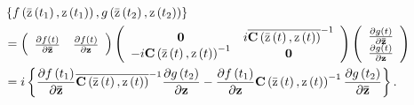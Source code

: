 \documentclass[aps,preprint]{revtex4}%
\begin{document}
\begin{align}
&  \left\{  f\left(  \mathrm{\bar{z}}\left(  t_{1}\right)  \mathrm{,z}\left(
t_{1}\right)  \right)  ,g\left(  \mathrm{\bar{z}}\left(  t_{2}\right)
\mathrm{,z}\left(  t_{2}\right)  \right)  \right\} \nonumber\\
&  =\left(
\begin{array}
[c]{cc}%
\frac{\partial f\left(  t\right)  }{\partial\mathbf{\bar{z}}} & \frac{\partial
f\left(  t\right)  }{\partial\mathbf{z}}%
\end{array}
\right)  \left(
\begin{array}
[c]{cc}%
\mathbf{0} & i\overline{\mathbf{C}\left(  \mathrm{\bar{z}}\left(  t\right)
\mathrm{,z}\left(  t\right)  \right)  }^{-1}\\
-i\mathbf{C}\left(  \mathrm{\bar{z}}\left(  t\right)  \mathrm{,z}\left(
t\right)  \right)  ^{-1} & \mathbf{0}%
\end{array}
\right)  \left(
\begin{array}
[c]{c}%
\frac{\partial g\left(  t\right)  }{\partial\mathbf{\bar{z}}}\\
\frac{\partial g\left(  t\right)  }{\partial\mathbf{z}}%
\end{array}
\right) \\
&  =i\left\{  \frac{\partial f\left(  t_{1}\right)  }{\partial\mathbf{\bar{z}%
}}\overline{\mathbf{C}\left(  \mathrm{\bar{z}}\left(  t\right)  \mathrm{,z}%
\left(  t\right)  \right)  }^{-1}\frac{\partial g\left(  t_{2}\right)
}{\partial\mathbf{z}}-\frac{\partial f\left(  t_{1}\right)  }{\partial
\mathbf{z}}\mathbf{C}\left(  \mathrm{\bar{z}}\left(  t\right)  \mathrm{,z}%
\left(  t\right)  \right)  ^{-1}\frac{\partial g\left(  t_{2}\right)
}{\partial\mathbf{\bar{z}}}\right\}  .
\end{align}%
\end{document}
